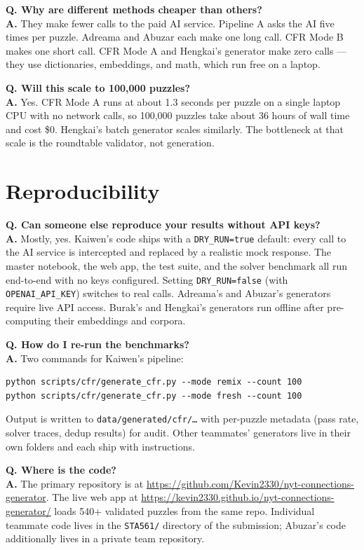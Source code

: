 \documentclass[11pt, letterpaper]{article}
\newcommand{\qitem}[1]{\vspace{0.6em}\noindent\textbf{\color{accent}Q. #1}\\[0.2em]}
\newcommand{\aitem}{\noindent\textbf{A.} }
\begin{document}
\qitem{Why are different methods cheaper than others?}
\aitem
They make fewer calls to the paid AI service. Pipeline A asks the AI five
times per puzzle. Adreama and Abuzar each make one long call. CFR Mode B
makes one short call. CFR Mode A and Hengkai's generator make zero calls ---
they use dictionaries, embeddings, and math, which run free on a laptop.

\qitem{Will this scale to 100{,}000 puzzles?}
\aitem
Yes. CFR Mode A runs at about 1.3 seconds per puzzle on a single laptop CPU
with no network calls, so 100{,}000 puzzles take about 36 hours of wall time
and cost \$0. Hengkai's batch generator scales similarly. The bottleneck
at that scale is the roundtable validator, not generation.

\section*{Reproducibility}

\qitem{Can someone else reproduce your results without API keys?}
\aitem
Mostly, yes. Kaiwen's code ships with a \texttt{DRY\_RUN=true} default:
every call to the AI service is intercepted and replaced by a realistic
mock response. The master notebook, the web app, the test suite, and the
solver benchmark all run end-to-end with no keys configured. Setting
\texttt{DRY\_RUN=false} (with \texttt{OPENAI\_API\_KEY}) switches to real
calls. Adreama's and Abuzar's generators require live API access. Burak's
and Hengkai's generators run offline after pre-computing their embeddings
and corpora.

\qitem{How do I re-run the benchmarks?}
\aitem
Two commands for Kaiwen's pipeline:
\begin{verbatim}
python scripts/cfr/generate_cfr.py --mode remix --count 100
python scripts/cfr/generate_cfr.py --mode fresh --count 100
\end{verbatim}
Output is written to \texttt{data/generated/cfr/\dots} with per-puzzle
metadata (pass rate, solver traces, dedup results) for audit. Other
teammates' generators live in their own folders and each ship with
instructions.

\qitem{Where is the code?}
\aitem
The primary repository is at
\url{https://github.com/Kevin2330/nyt-connections-generator}. The live web
app at
\url{https://kevin2330.github.io/nyt-connections-generator/}
loads 540+ validated puzzles from the same repo. Individual teammate code
lives in the \texttt{STA561/} directory of the submission; Abuzar's code
additionally lives in a private team repository.
\end{document}

